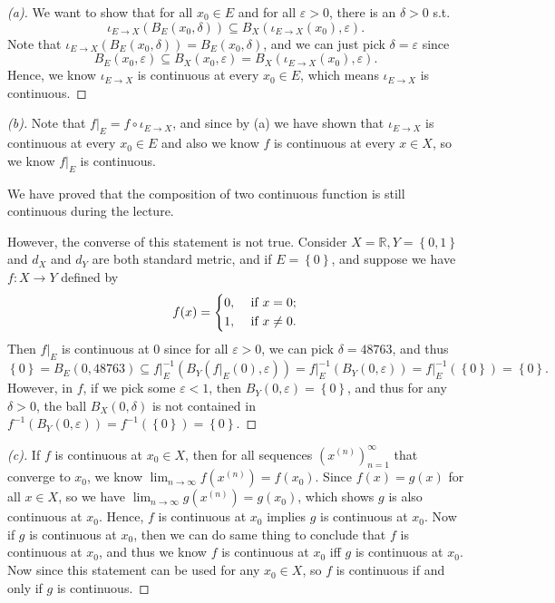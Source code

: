 \begin{proof}[(a)]
   We want to show that for all \(x_0 \in E\) and  for all \(\varepsilon > 0\), there is an \(\delta > 0\) s.t. 
   \[
    \iota_{E \to X} \left( B_E(x_0, \delta ) \right) \subseteq B_X (\iota_{E \to X}(x_0), \varepsilon ). 
   \] Note that \(\iota_{E \to X} \left( B_E(x_0, \delta ) \right) = B_E(x_0, \delta )\), and we can just pick \(\delta = \varepsilon \) since 
   \[
    B_E(x_0, \varepsilon ) \subseteq B_X(x_0, \varepsilon ) = B_X(\iota_{E \to X} (x_0), \varepsilon ).
   \] Hence, we know \(\iota_{E \to X}\) is continuous at every \(x_0 \in E\), which means \(\iota_{E \to X}\) is continuous.       
\end{proof}
\begin{proof}[(b)]
  Note that \(f \vert _E = f \circ \iota_{E \to X}\), and since by (a) we have shown that \(\iota_{E \to X}\) is continuous at every \(x_0 \in E\)  and also we know \(f\) is continuous at every \(x \in X\), so we know \(f \vert_E\) is continuous.
  \begin{note}
    We have proved that the composition of two continuous function is still continuous during the lecture.
  \end{note}    
  However, the converse of this statement is not true. Consider \(X = \mathbb{R}, Y = \left\{ 0, 1 \right\}  \) and \(d_X\) and \(d_Y\) are both standard metric, and if \(E = \left\{ 0 \right\} \), and suppose we have \(f: X \to Y\) defined by 
  \[
    f(x) = \begin{dcases}
      0, &\text{ if } x=0 ;\\
      1, &\text{ if } x \neq 0.
    \end{dcases}
  \]
  Then \(f\vert_E\) is continuous at \(0\) since for all \(\varepsilon > 0\), we can pick \(\delta = 48763\), and thus 
  \[
    \left\{ 0 \right\} = B_E (0, 48763) \subseteq f\vert_E^{-1} \left( B_Y(f\vert_E(0), \varepsilon ) \right) = f\vert_E^{-1}(B_Y(0, \varepsilon )) = f\vert_E^{-1}(\left\{ 0 \right\} ) = \left\{ 0 \right\} . 
  \] However, in \(f\), if we pick some \(\varepsilon < 1\), then \(B_Y(0, \varepsilon ) = \left\{ 0 \right\} \), and thus for any \(\delta > 0\), the ball \(B_X(0, \delta )\) is not contained in \(f^{-1} \left( B_Y(0, \varepsilon ) \right) = f^{-1}(\left\{ 0 \right\} ) = \left\{ 0 \right\} \).     
\end{proof}
\begin{proof}[(c)]
  If \(f\) is continuous at \(x_0 \in X\), then for all sequences \(\left( x^{(n)} \right)_{n=1}^{\infty}  \) that converge to \(x_0\), we know \(\lim_{n \to \infty} f \left( x^{(n)} \right) = f(x_0)  \). Since \(f(x) = g(x)\) for all \(x \in X\), so we have \(\lim_{n \to \infty} g \left( x^{(n)} \right) = g(x_0)  \), which shows \(g\) is also continuous at \(x_0\). Hence, \(f\) is continuous at \(x_0\) implies \(g\) is continuous at \(x_0\). Now if \(g\) is continuous at \(x_0\), then we can do same thing to conclude that \(f\) is continuous at \(x_0\), and thus we know \(f\) is continuous at \(x_0\) iff \(g\) is continuous at \(x_0\). Now since this statement can be used for any \(x_0 \in X\), so \(f\) is continuous if and only if \(g\) is continuous.                      
\end{proof}

